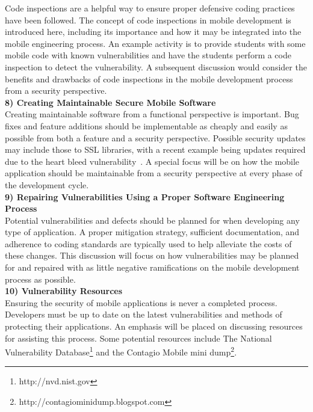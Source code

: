 \documentclass{sig-alternate}
\begin{document}
Code inspections are a helpful way to ensure proper defensive coding practices have been followed. The concept of code inspections in mobile development is introduced here, including its importance and how it may be integrated into the mobile engineering process. An example activity is to provide students with some mobile code with known vulnerabilities and have the students perform a code inspection to detect the vulnerability. A subsequent discussion would consider the benefits and drawbacks of code inspections in the mobile development process from a security perspective.\\

\textbf{8) Creating Maintainable Secure Mobile Software}\\
Creating maintainable software from a functional perspective is important. Bug fixes and feature additions should be implementable as cheaply and easily as possible from both a feature and a security perspective. Possible security updates may include those to SSL libraries, with a recent example being updates required due to the heart bleed vulnerability~\cite{heartbleed_URL}. A special focus will be on how the mobile application should be maintainable from a security perspective at every phase of the development cycle. \\

\textbf{9) Repairing Vulnerabilities Using a Proper Software Engineering Process}\\
Potential vulnerabilities and defects should be planned for when developing any type of application. A proper mitigation strategy, sufficient documentation, and adherence to coding standards are typically used to help alleviate the costs of these changes. This discussion will focus on how vulnerabilities may be planned for and repaired with as little negative ramifications on the mobile development process as possible. \\

\textbf{10) Vulnerability Resources}\\
Ensuring the security of mobile applications is never a completed process. Developers must be up to date on the latest vulnerabilities and methods of protecting their applications. An emphasis will be placed on discussing resources for assisting this process. Some potential resources include The National Vulnerability Database\footnote{http://nvd.nist.gov} and the Contagio Mobile mini dump\footnote{http://contagiominidump.blogspot.com}.\\
\end{document}

